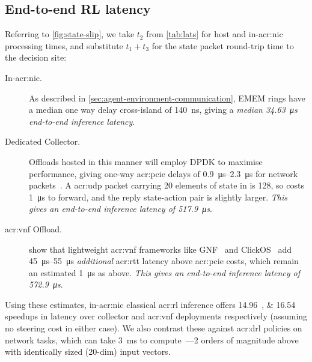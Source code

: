 \subsection{End-to-end RL latency}
Referring to \cref{fig:state-slip}, we take $t_2$ from \cref{tab:lats} for host and in-\gls{acr:nic} processing times, and substitute $t_1+t_3$ for the state packet round-trip time to the decision site:
\begin{description}
	\item[In-\gls{acr:nic}.] As described in \cref{sec:agent-environment-communication}, EMEM rings have a median one way delay cross-island of \qty{140}{\nano\second}, giving a \emph{median \qty{34.63}{\micro\second} end-to-end inference latency}.
	\item[Dedicated Collector.] Offloads hosted in this manner will employ DPDK to maximise performance, giving one-way \gls{acr:pcie} delays of \qtyrange{0.9}{2.3}{\micro\second} for network packets~\parencite{DBLP:conf/sigcomm/NeugebauerAZAL018}.
	A \gls{acr:udp} packet carrying \num{20} elements of state in \approachshort{} is \qty{128}{\byte}, so costs \qty{1}{\micro\second} to forward, and the reply state-action pair is slightly larger.
	\emph{This gives an end-to-end inference latency of \qty{517.9}{\micro\second}}.
	\item[\gls{acr:vnf} Offload.] \Textcite{DBLP:journals/cm/CzivaP17} show that  lightweight \gls{acr:vnf} frameworks like GNF~\parencite{DBLP:journals/cm/CzivaP17} and ClickOS~\parencite{DBLP:conf/nsdi/MartinsAROHBH14} add \qtyrange{45}{55}{\micro\second} \emph{additional} \gls{acr:rtt} latency above \gls{acr:pcie} costs, which remain an estimated \qty{1}{\micro\second} as above.
	\emph{This gives an end-to-end inference latency of \qty{572.9}{\micro\second}}.
\end{description}
Using these estimates, in-\gls{acr:nic} classical \gls{acr:rl} inference offers \qtylist{14.96;16.54}{\times} speedups in latency over collector and \gls{acr:vnf} deployments respectively (assuming no steering cost in either case).
We also contrast these against \gls{acr:drl} policies on network tasks, which can take \qty{3}{\milli\second} to compute~\parencite{DBLP:journals/corr/abs-1910-04054}---2 orders of magnitude above \approachshort{} with identically sized (20-dim) input vectors.


